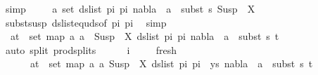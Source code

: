 \begin{isabellebody}
\ simp\isanewline
\ \ \ \isamarkupfalse%
\ {\isachardoublequoteopen}{\isasymforall}a{\isasymin}\ set\ {\isacharparenleft}{\kern0pt}ds{\isacharunderscore}{\kern0pt}list\ pi{}\ pi{}{\isacharparenright}{\kern0pt}{\isachardot}{\kern0pt}\ nabla{}\ {\isasymturnstile}\ a\ {\isasymsharp}\ subst\ s{}\ {\isacharparenleft}{\kern0pt}Susp\ {\isacharbrackleft}{\kern0pt}{\isacharbrackright}{\kern0pt}\ X{\isacharparenright}{\kern0pt}{\isachardoublequoteclose}\isanewline
\ \ \ \ \ \isamarkupfalse%
\ subst{\isacharunderscore}{\kern0pt}susp\ ds{\isacharunderscore}{\kern0pt}list{\isacharunderscore}{\kern0pt}equ{\isacharunderscore}{\kern0pt}ds{\isacharbrackleft}{\kern0pt}of\ pi{}\ pi{}{\isacharbrackright}{\kern0pt}\ \isamarkupfalse%
\ simp\isanewline
\ \ \ \isamarkupfalse%
\ {\isachardoublequoteopen}{\isasymforall}\ {\isacharparenleft}{\kern0pt}a{\isacharcomma}{\kern0pt}t{\isacharparenright}{\kern0pt}\ {\isasymin}\ set\ {\isacharparenleft}{\kern0pt}map\ {\isacharparenleft}{\kern0pt}{\isasymlambda}a{\isachardot}{\kern0pt}\ a\ {\isasymsharp}{\isacharquery}{\kern0pt}\ Susp\ {\isacharbrackleft}{\kern0pt}{\isacharbrackright}{\kern0pt}\ X{\isacharparenright}{\kern0pt}\ {\isacharparenleft}{\kern0pt}ds{\isacharunderscore}{\kern0pt}list\ pi{}\ pi{}{\isacharparenright}{\kern0pt}{\isacharparenright}{\kern0pt}{\isachardot}{\kern0pt}\ nabla{}\ {\isasymturnstile}\ a\ {\isasymsharp}\ subst\ s{}\ t{\isachardoublequoteclose}\isanewline
\ \ \ \ \isamarkupfalse%
\ {\isacharparenleft}{\kern0pt}auto\ split{\isacharcolon}{\kern0pt}\ prod{\isachardot}{\kern0pt}splits{\isacharparenright}{\kern0pt}\isanewline
\ \ \ \isamarkupfalse%
\ {}\ i{\isacharparenleft}{\kern0pt}{}{\isacharparenright}{\kern0pt}\isanewline
\ \ \ \isamarkupfalse%
\ fresh{\isacharcolon}{\kern0pt}\ \isanewline
\ \ \ \ \ {\isachardoublequoteopen}{\isasymforall}\ {\isacharparenleft}{\kern0pt}a{\isacharcomma}{\kern0pt}t{\isacharparenright}{\kern0pt}\ {\isasymin}\ set\ {\isacharparenleft}{\kern0pt}map\ {\isacharparenleft}{\kern0pt}{\isasymlambda}a{\isachardot}{\kern0pt}\ {\isacharparenleft}{\kern0pt}a{\isacharcomma}{\kern0pt}\ Susp\ {\isacharbrackleft}{\kern0pt}{\isacharbrackright}{\kern0pt}\ X{\isacharparenright}{\kern0pt}{\isacharparenright}{\kern0pt}\ {\isacharparenleft}{\kern0pt}ds{\isacharunderscore}{\kern0pt}list\ pi{}\ pi{}{\isacharparenright}{\kern0pt}\ {\isacharat}{\kern0pt}\ ys{\isacharparenright}{\kern0pt}{\isachardot}{\kern0pt}\ nabla{}\ {\isasymturnstile}\ a\ {\isasymsharp}\ subst\ s{}\ t{\isachardoublequoteclose}\isanewline

\end{isabellebody}

